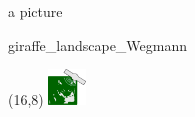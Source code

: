 \begin{frame}{a picture}
  
  
    \begin{center}
	  \begin{overpic} 
	 [width=.5\textwidth]{giraffe_landscape_Wegmann}
	 \end{overpic}
    \end{center}
 
 
       
      \begin{textblock}{4}(16,8)
	    \includegraphics[width=1cm]{lynx_logo}
      \end{textblock}
  
 \end{frame}
 
